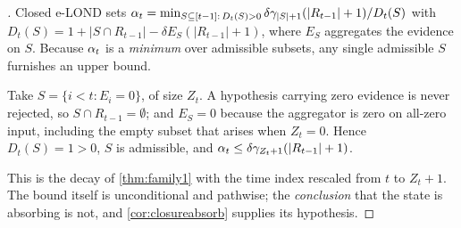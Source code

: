 \begin{proof}[]
Closed e-LOND sets
$\alpha_t = \min_{S\subseteq[t-1]:\,D_t(S)>0} \delta\gamma_{\lvert S\rvert+1}(\lvert R_{t-1}\rvert+1)/D_t(S)$
with $D_t(S) = 1 + \lvert S\cap R_{t-1}\rvert - \delta E_S(\lvert R_{t-1}\rvert+1)$, where $E_S$
aggregates the evidence on $S$. Because $\alpha_t$ is a \emph{minimum} over admissible subsets, any
single admissible $S$ furnishes an upper bound.

Take $S = \{i<t : E_i = 0\}$, of size $Z_t$. A hypothesis carrying zero evidence is never rejected, so
$S\cap R_{t-1} = \emptyset$; and $E_S = 0$ because the aggregator is zero on all-zero input,
including the empty subset that arises when $Z_t=0$. Hence
$D_t(S) = 1 > 0$, $S$ is admissible, and
$\alpha_t \le \delta\gamma_{Z_t+1}(\lvert R_{t-1}\rvert+1)$.

This is the decay of \cref{thm:family1} with the time index rescaled from $t$ to $Z_t+1$. The bound
itself is unconditional and pathwise; the \emph{conclusion} that the state is absorbing is not, and
\cref{cor:closureabsorb} supplies its hypothesis.
\end{proof}

